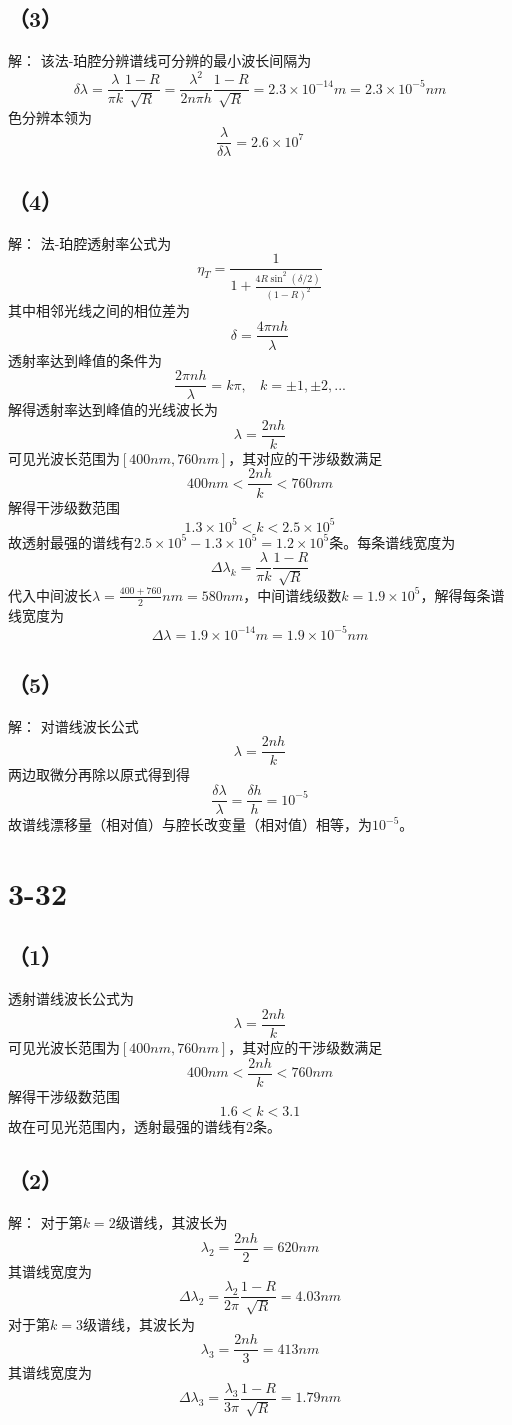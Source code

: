 \documentclass[10pt,a4paper]{article}
\begin{document}
\subsection*{（3）}解：
该法-珀腔分辨谱线可分辨的最小波长间隔为
\[
\delta\lambda = \frac{\lambda}{\pi k}\frac{1-R}{\sqrt{R}} = \frac{\lambda^2}{2n\pi h}\frac{1-R}{\sqrt{R}} = 2.3\times10^{-14}m = 2.3\times10^{-5}nm
\]
色分辨本领为
\[
\frac{\lambda}{\delta\lambda} = 2.6\times10^7
\]
\subsection*{（4）}解：
法-珀腔透射率公式为
\[
\eta_T = \frac{1}{1+\frac{4R\sin^2(\delta/2)}{(1-R)^2}}
\]
其中相邻光线之间的相位差为
\[
\delta = \frac{4\pi nh}{\lambda}
\]
透射率达到峰值的条件为
\[
\frac{2\pi nh}{\lambda} = k\pi, ~~~~k = \pm1,\pm2,...
\]
解得透射率达到峰值的光线波长为
\[
\lambda = \frac{2nh}{k}
\]
可见光波长范围为$[400nm, 760nm]$，其对应的干涉级数满足
\[
400nm < \frac{2nh}{k} < 760nm
\]
解得干涉级数范围
\[
1.3\times10^5 < k < 2.5\times10^5
\]
故透射最强的谱线有$2.5\times10^5 - 1.3\times10^5 = 1.2\times10^5$条。每条谱线宽度为
\[
\Delta\lambda_k = \frac{\lambda}{\pi k}\frac{1-R}{\sqrt{R}}
\]
代入中间波长$\lambda = \frac{400 + 760}{2}nm = 580nm$，中间谱线级数$k = 1.9\times10^5$，解得每条谱线宽度为
\[
\Delta\lambda = 1.9\times10^{-14}m = 1.9\times10^{-5}nm
\]
\subsection*{（5）}解：
对谱线波长公式
\[
\lambda = \frac{2nh}{k}
\]
两边取微分再除以原式得到得
\[
\frac{\delta\lambda}{\lambda} = \frac{\delta h}{h} = 10^{-5}
\]
故谱线漂移量（相对值）与腔长改变量（相对值）相等，为$10^{-5}$。
\section*{3-32}
\subsection*{（1）}
透射谱线波长公式为
\[
\lambda = \frac{2nh}{k}
\]
可见光波长范围为$[400nm, 760nm]$，其对应的干涉级数满足
\[
400nm < \frac{2nh}{k} < 760nm
\]
解得干涉级数范围
\[
1.6 < k < 3.1
\]
故在可见光范围内，透射最强的谱线有2条。
\subsection*{（2）}解：
对于第$k=2$级谱线，其波长为
\[
\lambda_2 = \frac{2nh}{2} = 620nm
\]
其谱线宽度为
\[
\Delta\lambda_2 = \frac{\lambda_2}{2\pi}\frac{1-R}{\sqrt{R}} = 4.03nm
\]
对于第$k=3$级谱线，其波长为
\[
\lambda_3 = \frac{2nh}{3} = 413nm
\]
其谱线宽度为
\[
\Delta\lambda_3 = \frac{\lambda_3}{3\pi}\frac{1-R}{\sqrt{R}} = 1.79nm
\]
\end{document}
